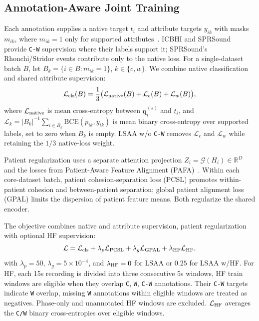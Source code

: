 \subsection{Annotation-Aware Joint Training}
\label{sec:joint_supervision}
\label{sec:hf_method}
Each annotation supplies a native target $t_i$ and attribute targets $y_{ik}$ with masks $m_{ik}$, where $m_{ik}=1$ only for supported attributes~\cite{shi2021marginal,zhou2022unknown,cole2021singlepositive,schutera2022frugal}. ICBHI and SPRSound provide \texttt{C-W} supervision where their labels support it; SPRSound's Rhonchi/Stridor events contribute only to the native loss. For a single-dataset batch $B$, let $B_k=\{i\in B:m_{ik}=1\}$, $k\in\{c,w\}$. We combine native classification and shared attribute supervision:
\begin{equation}
\mathcal L_{\rm cls}(B)=\frac{1}{3}\bigl(
\mathcal L_{\rm native}(B)+\mathcal L_c(B)+\mathcal L_w(B)\bigr),
\label{eq:classification_loss}
\end{equation}
where $\mathcal L_{\rm native}$ is mean cross-entropy between $\boldsymbol q_i^{(s)}$ and $t_i$, and $\mathcal L_k=|B_k|^{-1}\sum_{i\in B_k}\mathrm{BCE}(p_{ik},y_{ik})$ is mean binary cross-entropy over supported labels, set to zero when $B_k$ is empty. LSAA w/o \texttt{C-W} removes $\mathcal L_c$ and $\mathcal L_w$ while retaining the $1/3$ native-loss weight.

Patient regularization uses a separate attention projection $Z_i=\mathcal G(H_i)\in\mathbb{R}^{D}$ and the losses from Patient-Aware Feature Alignment (PAFA)~\cite{jeong2025pafa}. Within each core-dataset batch, patient cohesion-separation loss (PCSL) promotes within-patient cohesion and between-patient separation; global patient alignment loss (GPAL) limits the dispersion of patient feature means. Both regularize the shared encoder.

The objective combines native and attribute supervision, patient regularization with optional HF supervision:
\begin{equation}
\mathcal L=\mathcal L_{\rm cls}
 +\lambda_p\mathcal L_{\rm PCSL}
 +\lambda_g\mathcal L_{\rm GPAL}+\lambda_{\rm HF}\mathcal L_{\rm HF},
\label{eq:total_objective}
\end{equation}
with $\lambda_p=50$, $\lambda_g=5\times10^{-4}$, and $\lambda_{\rm HF}=0$ for LSAA or $0.25$ for LSAA w/HF. For HF, each 15s recording is divided into three consecutive 5s windows, HF train windows are eligible when they overlap \texttt{C}, \texttt{W}, \texttt{C-W} annotations. Their \texttt{C-W} targets indicate \texttt{W} overlap, missing \texttt{W} annotations within eligible windows are treated as negatives. Phase-only and unannotated HF windows are excluded. $\mathcal L_{\rm HF}$ averages the \texttt{C/W} binary cross-entropies over eligible windows.

